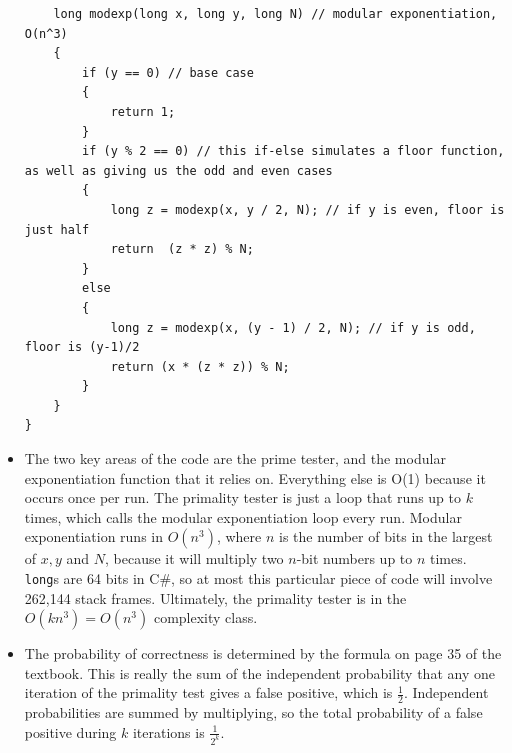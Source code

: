 \documentclass{article}
\begin{document}
\begin{itemize}
\begin{lstlisting}
    long modexp(long x, long y, long N) // modular exponentiation, O(n^3)
    {
        if (y == 0) // base case
        {
            return 1;
        }
        if (y % 2 == 0) // this if-else simulates a floor function, as well as giving us the odd and even cases
        {
            long z = modexp(x, y / 2, N); // if y is even, floor is just half
            return  (z * z) % N;
        }
        else
        {
            long z = modexp(x, (y - 1) / 2, N); // if y is odd, floor is (y-1)/2
            return (x * (z * z)) % N;
        }
    }
}
    \end{lstlisting}
    \item The two key areas of the code are the prime tester, and the modular exponentiation function that it relies on.  Everything else is O(1) because it occurs once per run.
    The primality tester is just a loop that runs up to $k$ times, which calls the modular exponentiation loop every run.  Modular exponentiation runs in $O(n^3)$, where $n$ is 
    the number of bits in the largest of $x, y$ and $N$, because it will multiply two $n$-bit numbers up to $n$ times.  \lstinline'long's are 64 bits in C\#, so at most this 
    particular piece of code will involve 262,144 stack frames.  Ultimately, the primality tester is in the $O(kn^3) = O(n^3)$ complexity class.
    \item The probability of correctness is determined by the formula on page 35 of the textbook.  This is really the sum of the independent probability that any one iteration
    of the primality test gives a false positive, which is $\frac{1}{2}$.  Independent probabilities are summed by multiplying, so the total probability of a false positive 
    during $k$ iterations is $\frac{1}{2^k}$.
\end{itemize}
\end{document}
